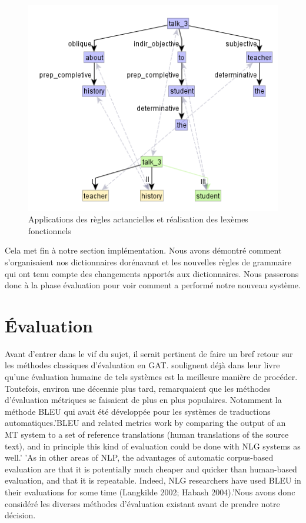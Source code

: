 \begin{figure}[htb]
	\centering
	\includegraphics[width=1\textwidth, trim = {0cm 0cm 0cm 0cm},clip]{ch6/figs/ssynt.png}
	\caption{Applications des règles actancielles et réalisation des lexèmes fonctionnels}
	\label{deroulement4}
\end{figure}

Cela met fin à notre section implémentation. Nous avons démontré comment s'organisaient nos dictionnaires dorénavant et les nouvelles règles de grammaire qui ont tenu compte des changements apportés aux dictionnaires. Nous passerons donc à la phase évaluation pour voir comment a performé notre nouveau système.

\section{Évaluation}
Avant d'entrer dans le vif du sujet, il serait pertinent de faire un bref retour sur les méthodes classiques d'évaluation en \ac{GAT}. \cite{ReiterBuildingNaturalLanguage2000} soulignent déjà dans leur livre qu'une évaluation humaine de tels systèmes est la meilleure manière de procéder. Toutefois, environ une décennie plus tard, \cite{ReiterInvestigationValidityMetrics2009} remarquaient que les méthodes d'évaluation métriques se faisaient de plus en plus populaires. Notamment la méthode BLEU qui avait été développée pour les systèmes de traductions automatiques.'BLEU and related metrics work by comparing the output of an MT system to a set of reference translations (human translations of the source text), and in principle this kind of evaluation could be done with NLG systems as well.' 'As in other areas of NLP, the advantages of automatic corpus-based evaluation are that it is potentially much cheaper and quicker than human-based evaluation, and that it is repeatable. Indeed, NLG researchers have used BLEU in their evaluations for some time (Langkilde 2002; Habash 2004).'Nous avons donc considéré les diverses méthodes d'évaluation existant avant de prendre notre décision.

